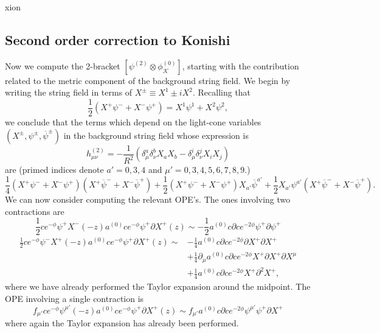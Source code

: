 xion\documentclass[12pt]{article}
\def\be{\begin{equation}}
\def\ee{\end{equation}}
\def\ie{\begin{equation}\begin{aligned}}
\def\fe{\end{aligned}\end{equation}}
\numberwithin{equation}{section}
\newcommand{\B}[1]{\overline{#1}}
\begin{document}
\subsection{Second order correction to Konishi}
Now we compute the 2-bracket $[\psi^{(2)}\otimes\phi_{\mathcal{K}}^{(0)}]$, starting with the contribution related to the metric component of the background string field. We begin by writing the string field in terms of $X^{\pm}\equiv X^1\pm iX^2$. Recalling that
\be
    \frac{1}{2}(X^+\psi^-+X^-\psi^+)=X^1\psi^1+X^2\psi^2,
\ee
we conclude that the terms which depend on the light-cone variables $(X^{\pm},\psi^{\pm},\B{\psi}^{\pm})$ in the background string field whose expression is
\be
h_{\mu\nu}^{(2)}=-\frac{1}{R^2}(\delta_{\mu}^a\delta_{\nu}^bX_aX_b-\delta_{\mu}^i\delta_{\nu}^jX_iX_j)
\ee
are (primed indices denote $a'=0,3,4$ and $\mu'=0,3,4,5,6,7,8,9$.)
\be
    \frac{1}{4}(X^+\psi^-+X^-\psi^+)(X^+\B{\psi}^-+X^-\B{\psi}^+)+\frac{1}{2}(X^+\psi^-+X^-\psi^+)X_{a'}\B{\psi}^{a'}+\frac{1}{2}X_{a'}\psi^{a'}(X^+\B{\psi}^-+X^-\B{\psi}^+).
\ee
We can now consider computing the relevant OPE's. The ones involving two contractions are
\be \label{2psi}
\frac{1}{2}ce^{-\phi}\psi^+X^-(-z)a^{(0)}ce^{-\phi}\psi^+\partial X^+(z)\sim -\frac{1}{2}a^{(0)}c\partial ce^{-2\phi}\psi^+\partial\psi^+
\ee
\ie
    \frac{1}{2}ce^{-\phi}\psi^-X^+(-z)a^{(0)}ce^{-\phi}\psi^+\partial X^+(z)\sim &-\frac{1}{4}a^{(0)}c\partial ce^{-2\phi}\partial X^+\partial X^+\\
    &+\frac{1}{4}\partial_{\mu}a^{(0)}c\partial ce^{-2\phi}X^+\partial X^+\partial X^{\mu}\\
    &+\frac{1}{4}a^{(0)}c\partial ce^{-2\phi}X^+\partial^2 X^+,
\fe
where we have already performed the Taylor expansion around the midpoint. The OPE involving a single contraction is
\be
    f_{\mu'}ce^{-\phi}\psi^{\mu'}(-z)a^{(0)}ce^{-\phi}\psi^+\partial X^+(z)\sim f_{\mu'}a^{(0)}c\partial ce^{-2\phi}\psi^{\mu'}\psi^+\partial X^+
\ee
where again the Taylor expansion has already been performed.
\end{document}
